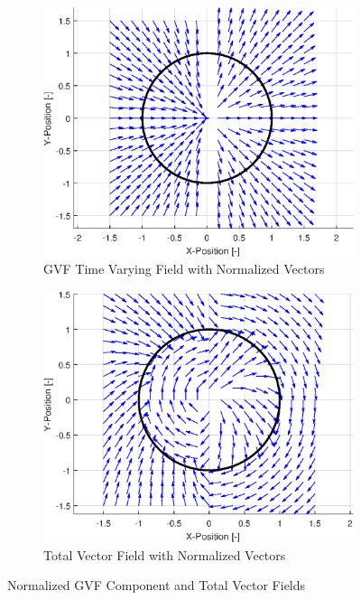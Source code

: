 \documentclass[conf]{new-aiaa}
\begin{document}
\begin{figure}[H]
\par\bigskip 
	\begin{subfigure}[t]{0.49\textwidth}
		\includegraphics[width=\linewidth]{TV}
		\caption{GVF Time Varying Field with Normalized Vectors}
		\label{fig:tv}
	\end{subfigure}
	\hfill
	\begin{subfigure}[t]{0.49\textwidth}
		\includegraphics[width=\linewidth]{All}
		\caption{Total Vector Field with Normalized Vectors}
		\label{fig:all}
	\end{subfigure}
\caption{Normalized GVF Component and Total Vector Fields}
\end{figure}
\end{document}
